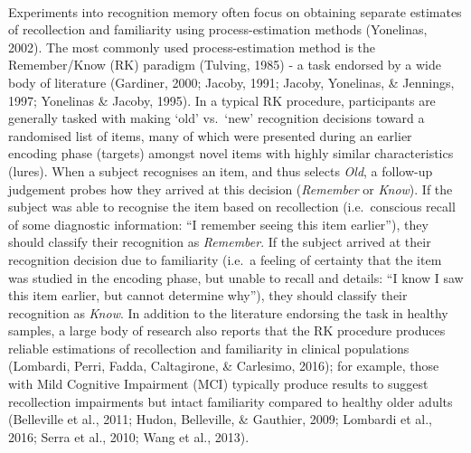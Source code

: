 \documentclass[
  11pt,
]{article}
\begin{document}
~

Experiments into recognition memory often focus on obtaining separate
estimates of recollection and familiarity using process-estimation
methods (Yonelinas, 2002). The most commonly used process-estimation
method is the Remember/Know (RK) paradigm (Tulving, 1985) - a task
endorsed by a wide body of literature (Gardiner, 2000; Jacoby, 1991;
Jacoby, Yonelinas, \& Jennings, 1997; Yonelinas \& Jacoby, 1995). In a
typical RK procedure, participants are generally tasked with making
`old' vs.~`new' recognition decisions toward a randomised list of items,
many of which were presented during an earlier encoding phase (targets)
amongst novel items with highly similar characteristics (lures). When a
subject recognises an item, and thus selects \emph{Old}, a follow-up
judgement probes how they arrived at this decision (\emph{Remember} or
\emph{Know}). If the subject was able to recognise the item based on
recollection (i.e.~conscious recall of some diagnostic information: ``I
remember seeing this item earlier''), they should classify their
recognition as \emph{Remember}. If the subject arrived at their
recognition decision due to familiarity (i.e.~a feeling of certainty
that the item was studied in the encoding phase, but unable to recall
and details: ``I know I saw this item earlier, but cannot determine
why''), they should classify their recognition as \emph{Know}. In
addition to the literature endorsing the task in healthy samples, a
large body of research also reports that the RK procedure produces
reliable estimations of recollection and familiarity in clinical
populations (Lombardi, Perri, Fadda, Caltagirone, \& Carlesimo, 2016);
for example, those with Mild Cognitive Impairment (MCI) typically
produce results to suggest recollection impairments but intact
familiarity compared to healthy older adults (Belleville et al., 2011;
Hudon, Belleville, \& Gauthier, 2009; Lombardi et al., 2016; Serra et
al., 2010; Wang et al., 2013).

~
\end{document}
